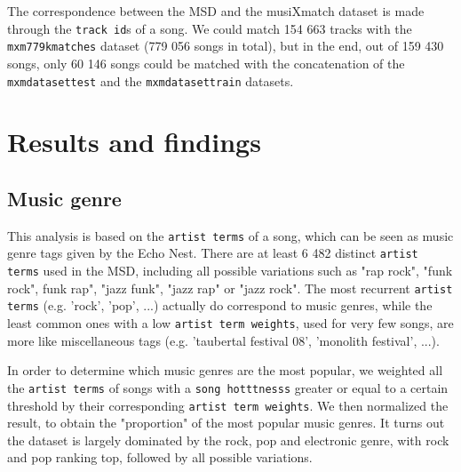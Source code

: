 \documentclass[11pt]{article}
\renewcommand\_{\textunderscore\allowbreak}
\begin{document}
The correspondence between the MSD and the musiXmatch dataset is made through the \texttt{track id}s of a song.
We could match 154 663 tracks with the \texttt{mxm\_779k\_matches} dataset (779 056 songs in total), but in the end, out of 159 430 songs, only 60 146 songs could be matched with the concatenation of the \texttt{mxm\_dataset\_test} and the \texttt{mxm\_dataset\_train} datasets.

\section{Results and findings}

\subsection{Music genre}
This analysis is based on the \texttt{artist terms} of a song, which can be seen as music genre tags given by the Echo Nest.
There are at least 6 482 distinct \texttt{artist terms} used in the MSD, including all possible variations such as "rap rock", "funk rock", funk rap", "jazz funk", "jazz rap" or "jazz rock".
The most recurrent \texttt{artist terms} (e.g. 'rock', 'pop', ...) actually do correspond to music genres, while the least common ones with a low \texttt{artist term weights}, used for very few songs, are more like miscellaneous tags (e.g. 'taubertal festival 08', 'monolith festival', ...).

In order to determine which music genres are the most popular, we weighted all the \texttt{artist terms} of songs with a \texttt{song hotttnesss} greater or equal to a certain threshold by their corresponding \texttt{artist term weights}. 
We then normalized the result, to obtain the "proportion" of the most popular music genres.
It turns out the dataset is largely dominated by the rock, pop and electronic genre, with rock and pop ranking top, followed by all possible variations.
\end{document}
